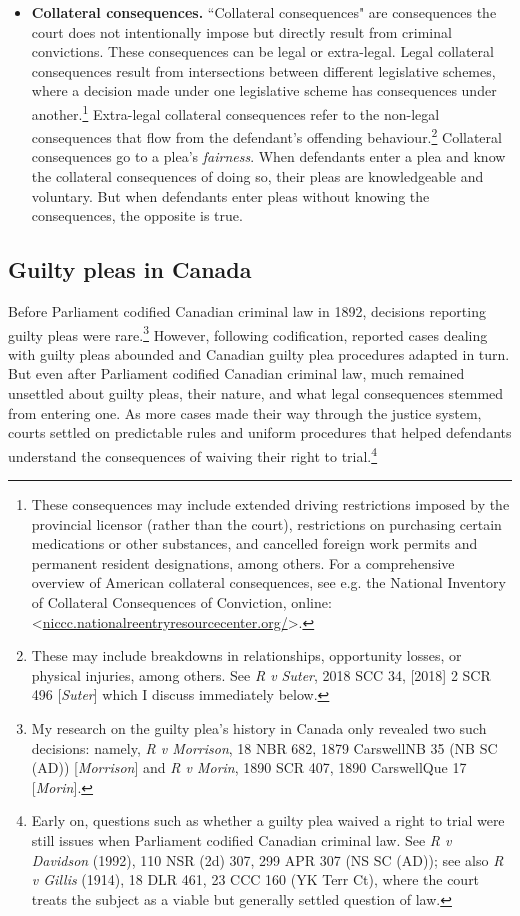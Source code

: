 \begin{itemize}
\item \textbf{Collateral consequences.} ``Collateral consequences" are consequences the court does not intentionally impose but directly result from criminal convictions. These consequences can be legal or extra-legal. Legal collateral consequences result from intersections between different legislative schemes, where a decision made under one legislative scheme has consequences under another.\footnote{These consequences may include extended driving restrictions imposed by the provincial licensor (rather than the court), restrictions on purchasing certain medications or other substances, and cancelled foreign work permits and permanent resident designations, among others. For a comprehensive overview of American collateral consequences, see e.g. the National Inventory of Collateral Consequences of Conviction, online: \textless \url{niccc.nationalreentryresourcecenter.org/}\textgreater.} Extra-legal collateral consequences refer to the non-legal consequences that flow from the defendant's offending behaviour.\footnote{These may include breakdowns in relationships, opportunity losses, or physical injuries, among others. See \textit{R v Suter}, 2018 SCC 34, [2018] 2 SCR 496 [\textit{Suter}] which I discuss immediately below.} Collateral consequences go to a plea's \textit{fairness}. When defendants enter a plea and know the collateral consequences of doing so, their pleas are knowledgeable and voluntary. But when defendants enter pleas without knowing the consequences, the opposite is true.
\end{itemize}

\subsection{Guilty pleas in Canada}

Before Parliament codified Canadian criminal law in 1892, decisions reporting guilty pleas were rare.\footnote{My research on the guilty plea's history in Canada only revealed two such decisions: namely, \textit{R v Morrison}, 18 NBR 682, 1879 CarswellNB 35 (NB SC (AD)) [\textit{Morrison}] and \textit{R v Morin}, 1890 SCR 407, 1890 CarswellQue 17 [\textit{Morin}].} However, following codification, reported cases dealing with guilty pleas abounded and Canadian guilty plea procedures adapted in turn. But even after Parliament codified Canadian criminal law, much remained unsettled about guilty pleas, their nature, and what legal consequences stemmed from entering one. As more cases made their way through the justice system, courts settled on predictable rules and uniform procedures that helped defendants understand the consequences of waiving their right to trial.\footnote{Early on, questions such as whether a guilty plea waived a right to trial were still issues when Parliament codified Canadian criminal law. See \textit{R v Davidson} (1992), 110 NSR (2d) 307, 299 APR 307 (NS SC (AD)); see also \textit{R v Gillis} (1914), 18 DLR 461, 23 CCC 160 (YK Terr Ct), where the court treats the subject as a viable but generally settled question of law.}

